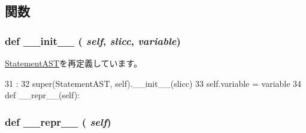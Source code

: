 \subsection{関数}
\hypertarget{classslicc_1_1ast_1_1CheckAllocateStatementAST_1_1CheckAllocateStatementAST_ac775ee34451fdfa742b318538164070e}{
\subsubsection[{\_\-\_\-init\_\-\_\-}]{\setlength{\rightskip}{0pt plus 5cm}def \_\-\_\-init\_\-\_\- ( {\em self}, \/   {\em slicc}, \/   {\em variable})}}
\label{classslicc_1_1ast_1_1CheckAllocateStatementAST_1_1CheckAllocateStatementAST_ac775ee34451fdfa742b318538164070e}


\hyperlink{classslicc_1_1ast_1_1StatementAST_1_1StatementAST_ac775ee34451fdfa742b318538164070e}{StatementAST}を再定義しています。


\begin{DoxyCode}
31                                        :
32         super(StatementAST, self).__init__(slicc)
33         self.variable = variable
34 
    def __repr__(self):
\end{DoxyCode}
\hypertarget{classslicc_1_1ast_1_1CheckAllocateStatementAST_1_1CheckAllocateStatementAST_ad8b9328939df072e4740cd9a63189744}{
\subsubsection[{\_\-\_\-repr\_\-\_\-}]{\setlength{\rightskip}{0pt plus 5cm}def \_\-\_\-repr\_\-\_\- ( {\em self})}}
\label{classslicc_1_1ast_1_1CheckAllocateStatementAST_1_1CheckAllocateStatementAST_ad8b9328939df072e4740cd9a63189744}



